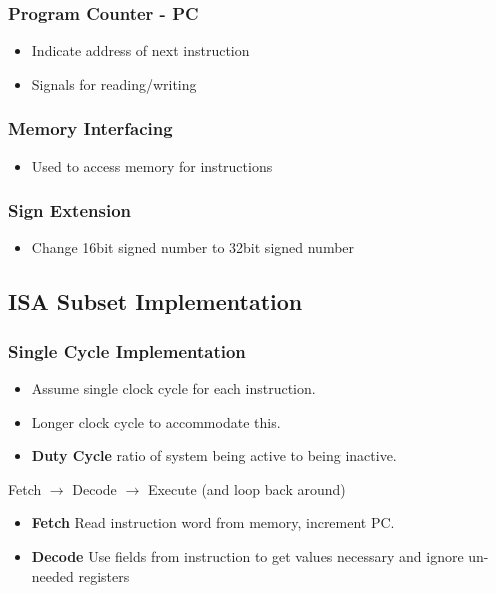 \documentclass{article}
\begin{document}
		\subsubsection*{Program Counter - PC}
			\begin{itemize}
				\item Indicate address of next instruction
				\item Signals for reading/writing
			\end{itemize}

		\subsubsection*{Memory Interfacing}
			\begin{itemize}
				\item Used to access memory for instructions
			\end{itemize}

		\subsubsection*{Sign Extension}
			\begin{itemize}
				\item Change 16bit signed number to 32bit signed number
			\end{itemize}

	\subsection*{ISA Subset Implementation}
		\subsubsection*{Single Cycle Implementation}
			\begin{itemize}
				\item Assume single clock cycle for each instruction.
				\item Longer clock cycle to accommodate this.
				\item \textbf{Duty Cycle} ratio of system being active to being inactive.
			\end{itemize}

		Fetch $\rightarrow$ Decode $\rightarrow$ Execute (and loop back around)

			\begin{itemize}
				\item \textbf{Fetch} Read instruction word from memory, increment PC.
				\item \textbf{Decode} Use fields from instruction to get values necessary and ignore un-needed registers
			\end{itemize}
\end{document}
